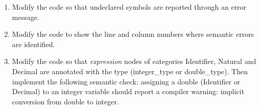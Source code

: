 \begin{enumerate}
\item Modify the code so that undeclared symbols are reported through an error message.
\item Modify the code to show the line and column numbers where semantic errors are identified.
\item Modify the code so that \textit{expression} nodes of categories Identifier, Natural and Decimal are annotated with the type (integer\_type or double\_type). Then implement the following semantic check: assigning a double (Identifier or Decimal) to an integer variable should report a compiler warning: implicit conversion from double to integer.
\end{enumerate}

